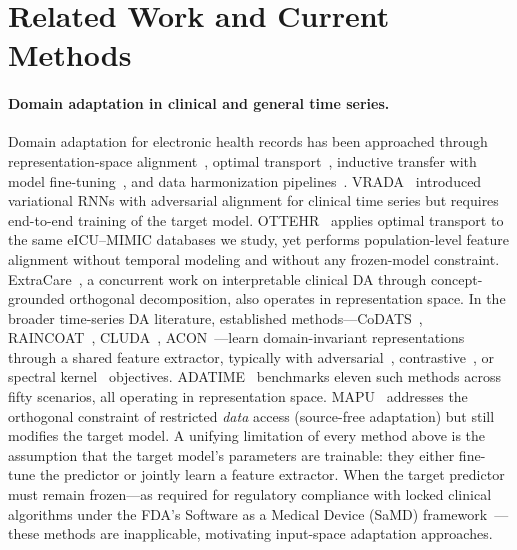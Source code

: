 \section{Related Work and Current Methods}
\label{sec:related}

\paragraph{Domain adaptation in clinical and general time series.}
Domain adaptation for electronic health records has been approached through
representation-space alignment~\cite{purushotham2017vrada,zhang2022adadiag,extracare2026},
optimal transport~\cite{ottehr2025},
inductive transfer with model fine-tuning~\cite{mutnuri2024,driever2025},
and data harmonization pipelines~\cite{purushotham2018benchmark,harutyunyan2019multitask}.
VRADA~\cite{purushotham2017vrada} introduced variational RNNs with adversarial alignment for
clinical time series but requires end-to-end training of the target model.
OTTEHR~\cite{ottehr2025} applies optimal transport to the same eICU--MIMIC databases we study,
yet performs population-level feature alignment without temporal modeling and without any
frozen-model constraint.
ExtraCare~\cite{extracare2026}, a concurrent work on interpretable clinical DA through concept-grounded
orthogonal decomposition, also operates in representation space.
In the broader time-series DA literature, established methods---CoDATS~\cite{wilson2020codats},
RAINCOAT~\cite{he2023raincoat}, CLUDA~\cite{ozyurt2023cluda},
ACON~\cite{liu2024acon}---learn domain-invariant representations through a shared feature
extractor, typically with adversarial~\cite{wilson2020codats}, contrastive~\cite{ozyurt2023cluda},
or spectral kernel~\cite{liu2021advskm} objectives.
ADATIME~\cite{ragab2023adatime} benchmarks eleven such methods across fifty scenarios, all
operating in representation space.
MAPU~\cite{ragab2023mapu} addresses the orthogonal constraint of restricted \emph{data} access
(source-free adaptation) but still modifies the target model.
A unifying limitation of every method above is the assumption that the target model's
parameters are trainable: they either fine-tune the predictor or jointly learn a feature
extractor.
When the target predictor must remain frozen---as required for regulatory compliance with
locked clinical algorithms under the FDA's Software as a Medical Device
(SaMD) framework~\cite{fda2021samd}---these methods are inapplicable,
motivating input-space adaptation approaches.

